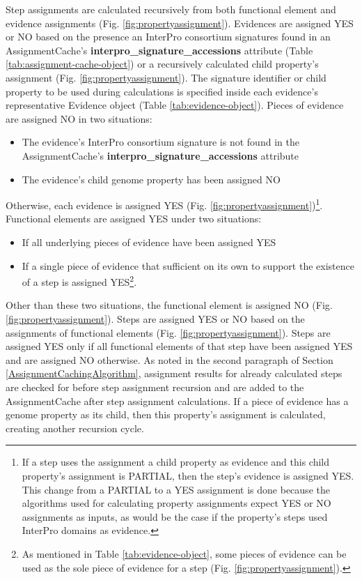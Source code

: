 Step assignments are calculated recursively from both functional element and 
evidence assignments (Fig. \ref{fig:propertyassignment}). Evidences are assigned 
YES or NO based on the presence an InterPro consortium signatures found in an 
AssignmentCache's \textbf{interpro\_signature\_accessions} attribute (Table 
\ref{tab:assignment-cache-object}) or a recursively calculated child property's 
assignment (Fig. \ref{fig:propertyassignment}). The signature identifier or 
child property to be used during calculations is specified inside each 
evidence's representative Evidence object (Table \ref{tab:evidence-object}). 
Pieces of evidence are assigned NO in two situations: 

\FloatBarrier
\begin{itemize}
\item The evidence's InterPro consortium signature is not found in the 
AssignmentCache's \textbf{interpro\_signature\_accessions} attribute 
\item The evidence's child genome property has been assigned NO 
\end{itemize}

Otherwise, each evidence is assigned YES (Fig. 
\ref{fig:propertyassignment})\footnote{If a step uses the assignment a child 
property as evidence and this child property's assignment is PARTIAL, then the 
step's evidence is assigned YES. This change from a PARTIAL to a YES assignment 
is done because the algorithms used for calculating property assignments expect 
YES or NO assignments as inputs, as would be the case if the property's steps 
used InterPro domains as evidence.}. Functional elements are assigned YES under 
two situations: 

\FloatBarrier
\begin{itemize}
\item If all underlying pieces of evidence have been assigned YES
\item If a single piece of evidence that sufficient on its own to support the 
existence of a step is assigned YES\footnote{As mentioned in Table 
\ref{tab:evidence-object}, some pieces of evidence can be used as the sole piece 
of evidence for a step (Fig. \ref{fig:propertyassignment}).}.
\end{itemize}

Other than these two situations, the functional element is assigned NO (Fig. 
\ref{fig:propertyassignment}). Steps are assigned YES or NO based on the 
assignments of functional elements (Fig. \ref{fig:propertyassignment}). Steps 
are assigned YES only if all functional elements of that step have been assigned 
YES and are assigned NO otherwise. As noted in the second paragraph of Section 
\ref{AssignmentCachingAlgorithm}, assignment results for already calculated 
steps are checked for before step assignment recursion and are added to the 
AssignmentCache after step assignment calculations. If a piece of evidence has a 
genome property as its child, then this property's assignment is calculated, 
creating another recursion cycle.

